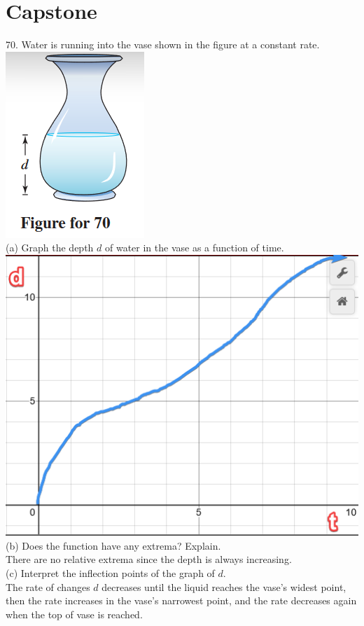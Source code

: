 \documentclass[11pt]{article}
\newcommand*{\next}{\noindent}
\begin{document}
\section{Capstone}
70. Water is running into the vase shown in the figure at a constant rate.\\
\includegraphics{70a.png}\\
(a) Graph the depth $d$ of water in the vase as a function of time.\\
\includegraphics[scale=0.5]{70b.png}\\
(b) Does the function have any extrema? Explain.\\
\indent There are no relative extrema since the depth is always increasing.\\
\next
(c) Interpret the inflection points of the graph of $d$.\\
\indent The rate of changes $d$ decreases until the liquid reaches the vase's widest point, then the rate increases in the vase's narrowest point, and the rate decreases again when the top of vase is reached.\\
\end{document}

